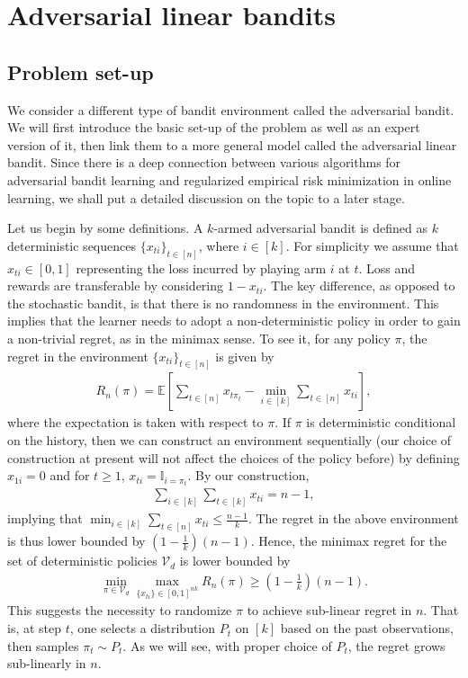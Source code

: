 \documentclass[10pt,a4article]{amsart}
\numberwithin{equation}{section}
\theoremstyle{plain}
\theoremstyle{definition}
\def\E{{\mathbb E}}
\begin{document}
\section{Adversarial linear bandits}

\subsection{Problem set-up}
We consider a different type of bandit environment called the adversarial bandit. We will first introduce the basic set-up of the problem as well as an expert version of it, then link them to a more general model called the adversarial linear bandit. Since there is a deep connection between various algorithms for adversarial bandit learning and regularized empirical risk minimization in online learning, we shall put a detailed discussion on the topic to a later stage.  

Let us begin by some definitions. A $k$-armed adversarial bandit is defined as $k$ deterministic sequences $\{x_{ti}\}_{t\in [n]}$, where $i\in [k]$. For simplicity we assume that $x_{ti}\in [0,1]$ representing the loss incurred by playing arm $i$ at $t$. Loss and rewards are transferable by considering $1-x_{ti}$. The key difference, as opposed to the stochastic bandit, is that there is no randomness in the environment. This implies that the learner needs to adopt a non-deterministic policy in order to gain a non-trivial regret, as in the minimax sense. To see it, for any policy $\pi$, the regret in the environment $\{x_{ti}\}_{t\in [n]}$ is given by
\begin{align*}
R_n(\pi) = \E\left[\sum_{t\in [n]}x_{t\pi_t}-\min_{i\in [k]}\sum_{t\in [n]}x_{ti}\right],
\end{align*}
where the expectation is taken with respect to $\pi$. If $\pi$ is deterministic conditional on the history, then we can construct an environment sequentially (our choice of construction at present will not affect the choices of the policy before) by defining $x_{1i}=0$ and for $t\geq 1$, $x_{ti}=\mathbb I_{i=\pi_t}$. By our construction,
\begin{align*}
\sum_{i\in [k]}\sum_{t\in [k]}x_{ti} = n-1,
\end{align*}
implying that $\min_{i\in [k]}\sum_{t\in [n]}x_{ti}\leq\frac{n-1}{k}$. The regret in the above environment is thus lower bounded by $(1-\frac{1}{k})(n-1)$. Hence, the minimax regret for the set of deterministic policies $\mathcal V_d$ is lower bounded by 
\begin{align}
\min_{\pi\in\mathcal V_d}\max_{\{x_{ti}\}\in [0,1]^{nk}}R_n(\pi)\geq \left(1-\frac{1}{k}\right)(n-1).\label{al:ct}
\end{align}
This suggests the necessity to randomize $\pi$ to achieve sub-linear regret in $n$. That is, at step $t$, one selects a distribution $P_t$ on $[k]$ based on the past observations, then samples $\pi_t\sim P_t$. As we will see, with proper choice of $P_t$, the regret grows sub-linearly in $n$.  
\end{document}
